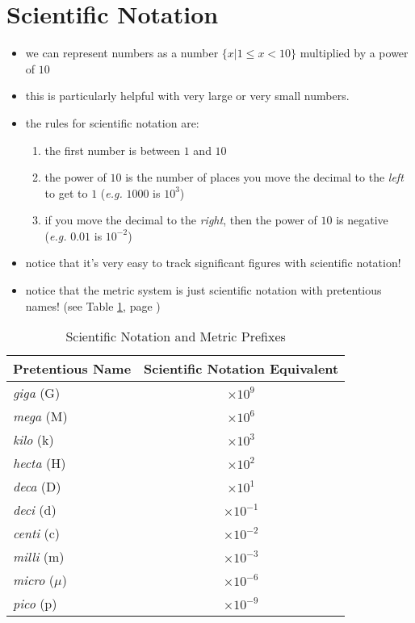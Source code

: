 \documentclass[11pt, oneside]{article}   	%
\begin{document}
\section{Scientific Notation}
\begin{itemize}
\item we can represent numbers as a number $\{ x | 1 \leq x < 10 \}$ multiplied by a power of $10$
\item this is particularly helpful with very large or very small numbers.
\item the rules for scientific notation are:
\begin{enumerate}
\item the first number is between $ 1 $ and $ 10 $
\item  the power of $ 10 $ is the number of places you move the decimal to the \emph{left} to get to $1$ (\emph{e.g.} $1000$ is $10^{3}$)
\item if you move the decimal to the \emph{right}, then the power of $ 10 $ is negative (\emph{e.g.} $0.01$ is $10^{-2}$)
\end{enumerate}
\item notice that it's very easy to track significant figures with scientific notation!
\item notice that the metric system is just scientific notation with pretentious names! (see Table \ref{table:pretentiousprefixes}, page \pageref{table:pretentiousprefixes})
 \end{itemize}

\begin{table}
\centering
\begin{tabular}[c]{l|c}
\hline
Pretentious Name & Scientific Notation Equivalent \\
\hline
\emph{giga} (G)  & $ \times 10^{9} $   \\
\emph{mega} (M)  & $ \times 10^{6} $   \\
\emph{kilo} (k)      & $ \times 10^{3} $   \\
\emph{hecta} (H)      & $ \times 10^{2} $   \\
\emph{deca} (D)      & $ \times 10^{1} $   \\
\emph{deci} (d)      & $ \times 10^{-1} $   \\
\emph{centi} (c)     & $ \times 10^{-2} $   \\
\emph{milli}  (m)    & $ \times 10^{-3} $  \\
\emph{micro} ($\mu$)  & $ \times 10^{-6} $  \\
\emph{pico}  (p) & $ \times 10^{-9} $  \\
\end{tabular}
\caption{Scientific Notation and Metric Prefixes}
\label{table:pretentiousprefixes}
\end{table}
\end{document}
